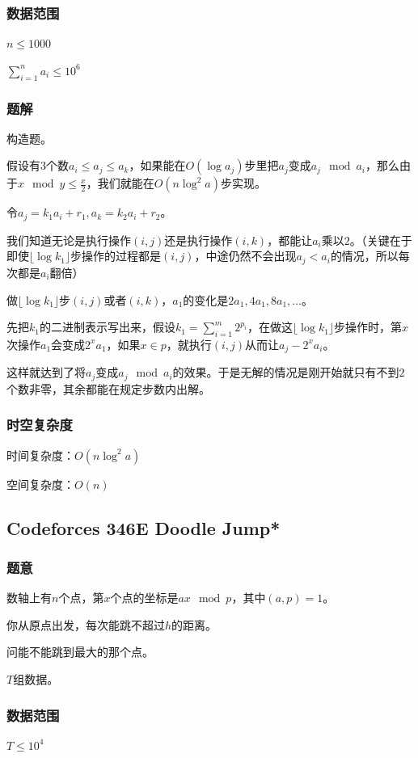 \documentclass{ctexart}
\begin{document}
\subsubsection{数据范围}
$n \le 1000$

$\sum\limits_{i=1}^n a_i \le 10^6$
\subsubsection{题解}
构造题。

假设有$3$个数$a_i \le a_j \le a_k$，如果能在$O(\log a_j)$步里把$a_j$变成$a_j \mod a_i$，那么由于$x \mod y \le \frac{x}{2}$，我们就能在$O(n \log^2 a)$步实现。

令$a_j=k_1a_i+r_1,a_k=k_2a_i+r_2$。

我们知道无论是执行操作$(i,j)$还是执行操作$(i,k)$，都能让$a_i$乘以$2$。（关键在于即使$\lfloor \log k_1 \rfloor$步操作的过程都是$(i,j)$，中途仍然不会出现$a_j < a_i$的情况，所以每次都是$a_i$翻倍）

做$\lfloor \log k_1 \rfloor$步$(i,j)$或者$(i,k)$，$a_1$的变化是$2a_1,4a_1,8a_1,\ldots$。

先把$k_1$的二进制表示写出来，假设$k_1=\sum\limits_{i=1}^m 2^{p_i}$，在做这$\lfloor \log k_1 \rfloor$步操作时，第$x$次操作$a_1$会变成$2^x a_1$，如果$x \in p$，就执行$(i,j)$从而让$a_j-2^x a_i$。

这样就达到了将$a_j$变成$a_j \mod a_i$的效果。于是无解的情况是刚开始就只有不到$2$个数非零，其余都能在规定步数内出解。
\subsubsection{时空复杂度}
时间复杂度：$O(n \log^2 a)$

空间复杂度：$O(n)$
\subsection{Codeforces 346E Doodle Jump*}
\subsubsection{题意}
数轴上有$n$个点，第$x$个点的坐标是$ax \mod p$，其中$(a,p)=1$。

你从原点出发，每次能跳不超过$h$的距离。

问能不能跳到最大的那个点。

$T$组数据。
\subsubsection{数据范围}
$T \le 10^4$
\end{document}
